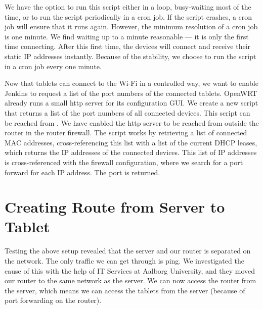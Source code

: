 We have the option to run this script either in a loop, busy-waiting most of the time, or to run the script periodically in a cron job. If the script crashes, a cron job will ensure that it runs again. However, the minimum resolution of a cron job is one minute. We find waiting up to a minute reasonable --- it is only the first time connecting. After this first time, the devices will connect and receive their static IP addresses instantly. Because of the stability, we choose to run the script in a cron job every one minute.




Now that tablets can connect to the Wi-Fi in a controlled way, we want to enable Jenkins to request a list of the port numbers of the connected tablets. OpenWRT already runs a small http server for its configuration GUI\@. We create a new script that returns a list of the port numbers of all connected devices. This script can be reached from . We have enabled the http server to be reached from outside the router in the router firewall.  The script works by retrieving a list of connected MAC addresses, cross-referencing this list with a list of the current DHCP leases, which returns the IP addresses of the connected devices. This list of IP addresses is cross-referenced with the firewall configuration, where we search for a port forward for each IP address. The port is returned.



\section{Creating Route from Server to Tablet}
Testing the above setup revealed that the server and our router is separated on the network. The only traffic we can get through is ping. We investigated the cause of this with the help of IT Services at Aalborg University, and they moved our router to the same network as the server. We can now access the router from the server, which means we can access the tablets from the server (because of port forwarding on the router).

